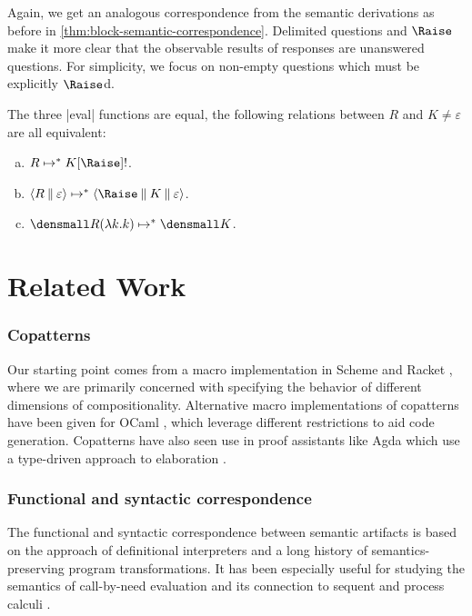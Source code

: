 \documentclass[sigplan,screen]{acmart}
\begin{document}
Again, we get an analogous correspondence from the semantic derivations as
before in \cref{thm:block-semantic-correspondence}.  Delimited questions and
$\Raise$ make it more clear that the observable results of responses are
unanswered questions.  For simplicity, we focus on non-empty questions which
must be explicitly $\Raise$d.

\begin{theorem}
\label{thm:nest-semantic-correspondence}

The three \hs|eval| functions are equal, \ie the following relations between $R$
and $K \neq \varepsilon$ are all equivalent:
\begin{enumerate}[(a)]
\item $R \mapsto^* K[\Raise]\ans$.
\item $\cut{R}{\varepsilon} \mapsto^* \braket{{\Raise} \cmid K \cmid \varepsilon}$.
\item $\den{R}(\lambda k. k) \mapsto^* \den{K}$.
\end{enumerate}
\end{theorem}


\section{Related Work}
\label{sec:related-work}

\subsubsection*{Copatterns}
%
Our starting point comes from a macro implementation in Scheme and Racket
\cite{CoScheme}, where we are primarily concerned with specifying the behavior
of different dimensions of compositionality.  Alternative macro implementations
of copatterns have been given for OCaml \cite{LaforgueR17,jeannin_cocaml_2017},
which leverage different restrictions to aid code generation.  Copatterns have
also seen use in proof assistants like Agda
\cite{ElaboratingDependentCopatterns} which use a type-driven approach to
elaboration \cite{UnnestingCopatterns,ThibodeauMasters}.

\subsubsection*{Functional and syntactic correspondence}
%
The functional and syntactic correspondence between semantic artifacts
\cite{FunctionalCorrespondence,SyntacticCorrespondence,SmallStepBigStepMachines,DefunctionalizedInterpreters,InterDerivingSemanticArtifactsOOP,WalkInTheSemanticPark}
is based on the approach of definitional interpreters
\cite{DefinitionalInterpreters} and a long history of semantics-preserving
program transformations.  It has been especially useful for studying the
semantics of call-by-need evaluation
\cite{DefunctionalizedInterpretersCBNeed,InterDerivingSmallStepBigStepCBNeed,SyntheicOperationalCBNeed}
and its connection to sequent \cite{ADHNS2012CCSC} and process calculi
\cite{DMAV2014CPS}.
\end{document}
